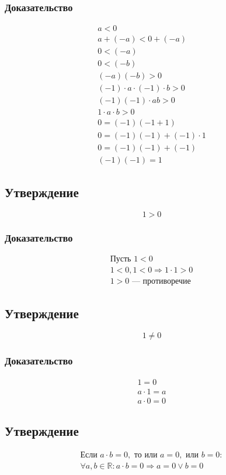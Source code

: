 \documentclass{article}
\begin{document}
\subsubsection{Доказательство}
\begin{gather*}
    a < 0 \\
    a + (-a) < 0 + (-a) \\
    0 < (-a) \\
    0 < (-b) \\
    (-a)(-b) > 0 \\
    (-1) \cdot a \cdot (-1) \cdot b > 0 \\
    (-1)(-1) \cdot ab > 0 \\
    1 \cdot a \cdot b > 0 \\
    0 = (-1)(-1 + 1) \\
    0 = (-1)(-1) + (-1) \cdot 1 \\
    0 = (-1)(-1) + (-1) \\
    (-1)(-1) = 1
\end{gather*}


\subsection{Утверждение}
\[
    1 > 0
\]

\subsubsection{Доказательство}
\begin{gather*}
    \text{Пусть } 1 < 0 \\
    1 < 0, 1 < 0 \Rightarrow 1 \cdot 1 > 0 \\
    1 > 0 \text{ --- противоречие }
\end{gather*}


\subsection{Утверждение}
\[
    1 \neq 0
\]

\subsubsection{Доказательство}
\begin{gather*}
    1 = 0 \\
    a \cdot 1 = a \\
    a \cdot 0 = 0
\end{gather*}


\subsection{Утверждение}
\begin{gather*}
    \text{Если } a \cdot b = 0, \text{ то или } a = 0, \text{ или } b = 0: \\
    \forall a, b \in \mathbb{R}: a \cdot b = 0 \Rightarrow a = 0 \vee b = 0
\end{gather*}
\end{document}
